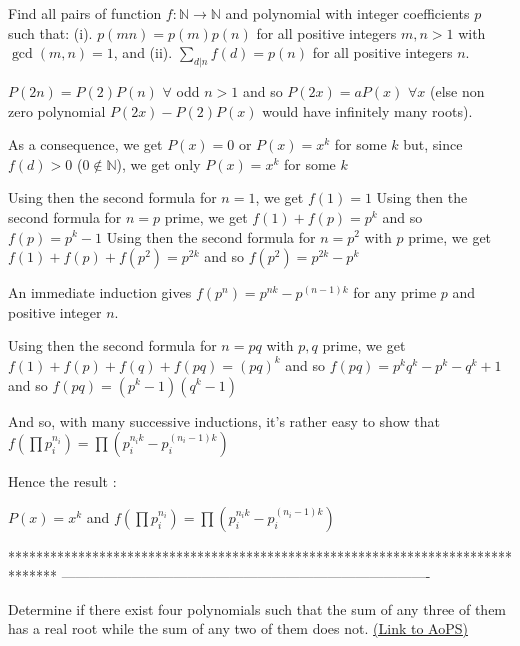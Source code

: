 \begin{solution}
	\begin{tcolorbox}Find all pairs of function $ f: \mathbb{N} \rightarrow \mathbb{N}$ and polynomial with integer coefficients $ p$ such that:
(i). $ p(mn) = p(m)p(n)$ for all positive integers $ m,n > 1$ with $ \gcd(m,n) = 1$, and
(ii). $ \sum_{d|n}f(d) = p(n)$ for all positive integers $ n$.\end{tcolorbox}

$ P(2n)=P(2)P(n)$ $ \forall$ odd $ n>1$ and so $ P(2x)=aP(x)$ $ \forall x$ (else non zero polynomial $ P(2x)-P(2)P(x)$ would have infinitely many roots).

As a consequence, we get $ P(x)=0$ or $ P(x)=x^k$ for some $ k$ but, since $ f(d)>0$ ($ 0\notin\mathbb N$), we get only $ P(x)=x^k$ for some $ k$ 

Using then the second formula for $ n=1$, we get $ f(1)=1$
Using then the second formula for $ n=p$ prime, we get $ f(1)+f(p)=p^k$ and so $ f(p)=p^k-1$
Using then the second formula for $ n=p^2$ with $ p$ prime, we get $ f(1)+f(p)+f(p^2)=p^{2k}$ and so $ f(p^2)=p^{2k}-p^k$

An immediate induction gives $ f(p^n)=p^{nk}-p^{(n-1)k}$ for any prime $ p$ and positive integer $ n$.

Using then the second formula for $ n=pq$ with $ p,q$ prime, we get $ f(1)+f(p)+f(q)+f(pq)=(pq)^k$ and so $ f(pq)=p^kq^k-p^k-q^k+1$ and so $ f(pq)=(p^k-1)(q^k-1)$

And so, with many successive inductions, it's rather easy to show that $ f(\prod p_i^{n_i})=\prod(p_i^{n_ik}-p_i^{(n_i-1)k})$

Hence the result :

$ P(x)=x^k$ and $ f(\prod p_i^{n_i})=\prod(p_i^{n_ik}-p_i^{(n_i-1)k})$
\end{solution}
*******************************************************************************
-------------------------------------------------------------------------------

\begin{problem}
	Determine if there exist four polynomials such that the sum of any three of them has a real root while the sum of any two of them does not.
	\flushright \href{https://artofproblemsolving.com/community/c6h312613}{(Link to AoPS)}
\end{problem}



